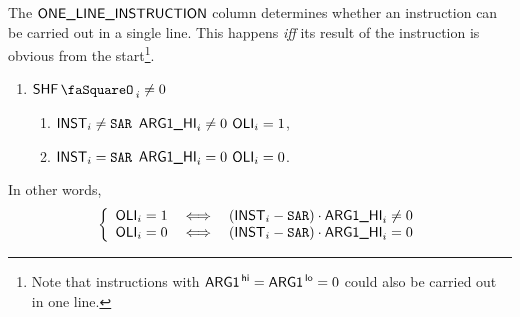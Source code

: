 The $\textsf{ONE\_LINE\_INSTRUCTION}$ column determines whether an instruction can be carried out in a single line. This happens \emph{iff} its result of the instruction is obvious from the start\footnote{Note that instructions with $\textsf{ARG}\textsf{1}^{\mathsf{\,hi}} = \textsf{ARG}\textsf{1}^{\mathsf{\,lo}} = 0$ could also be carried out in one line.}.
\begin{enumerate}
	\item \If $\shfStamp_{i} \neq 0$ \Then
	\begin{enumerate}
		\item \If $\textsf{INST}_{i} \neq \texttt{SAR}$ \et $\textsf{ARG}\textsf{1}\textsf{\_HI}_{i} \neq 0$ \Then $\textsf{OLI}_{i} = 1$,
		\item \If $\textsf{INST}_{i} =    \texttt{SAR}$ \OR $\textsf{ARG}\textsf{1}\textsf{\_HI}_{i} =    0$ \Then $\textsf{OLI}_{i} = 0$.
	\end{enumerate}
\end{enumerate}
In other words,
\[
\left\{
\begin{array}{lcl}
	\textsf{OLI}_{i} = 1 & \iff & (\textsf{INST}_{i} - \texttt{SAR}) \cdot \textsf{ARG}\textsf{1}\textsf{\_HI}_{i} \neq 0 \\
	\textsf{OLI}_{i} = 0 & \iff & (\textsf{INST}_{i} - \texttt{SAR}) \cdot \textsf{ARG}\textsf{1}\textsf{\_HI}_{i} = 0 \\
\end{array}
\right.
\]
